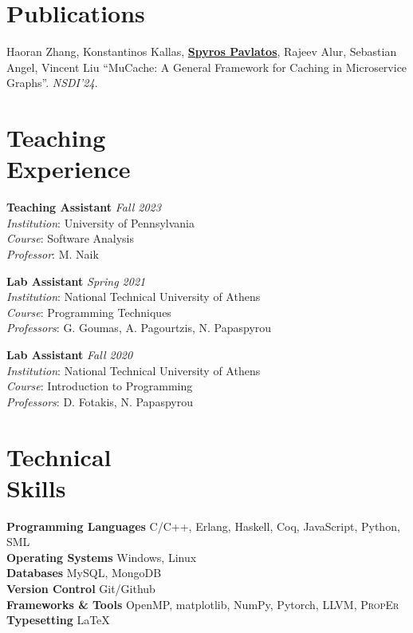 \documentclass[margin]{res}
\newcommand{\field}[2]{\noindent \textbf{#1} \hfill #2 \\}
\newcommand{\authorref}[1]{\underline {\textbf{#1}}}
\newcommand{\authorme}{\authorref{Spyros Pavlatos}}
\begin{document}
\begin{resume}
\section{Publications}

\begin{enumerate}[nosep, label={[\arabic*]}]  
 
  \item Haoran Zhang, Konstantinos Kallas,  \authorme, Rajeev Alur, Sebastian Angel, Vincent Liu ``MuCache: A General Framework for Caching in Microservice Graphs''. \emph{NSDI'24}.
\end{enumerate}

\section{Teaching \\ Experience}

\field{Teaching Assistant}{\emph{Fall 2023}}
\textit{Institution}: University of Pennsylvania \\
\textit{Course}: Software Analysis \\
\textit{Professor}: M. Naik

\field{Lab Assistant}{\emph{Spring 2021}}
\textit{Institution}: National Technical University of Athens \\
\textit{Course}: Programming Techniques \\
\textit{Professors}: G. Goumas, A. Pagourtzis, N. Papaspyrou

\field{Lab Assistant}{\emph{Fall 2020}}
\textit{Institution}: National Technical University of Athens \\
\textit{Course}: Introduction to Programming \\
\textit{Professors}: D. Fotakis, N. Papaspyrou

\section{Technical \\ Skills}

\field{Programming Languages}  {C/C++, Erlang, Haskell, Coq, JavaScript, Python, SML} 
\field{Operating Systems} {Windows, Linux}
\field{Databases} {MySQL, MongoDB}
\field{Version Control} {Git/Github}
\field{Frameworks \& Tools} {OpenMP, matplotlib, NumPy, Pytorch, LLVM, \textsc{PropEr}}
\field{Typesetting} {\LaTeX}


\end{resume}
\end{document}
